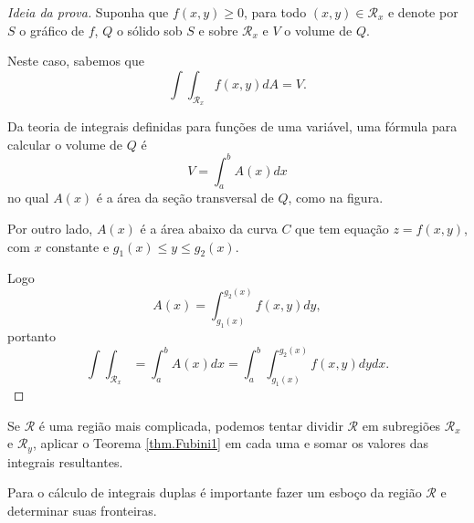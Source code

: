 \begin{proof}[Ideia da prova]
    Suponha que \(f(x,y) \geq 0\), para todo \((x,y)\in\mathcal{R}_x\) e denote por \(S\) o gráfico de \(f\), \(Q\) o sólido sob \(S\) e sobre \(\mathcal{R}_x\) e \(V\) o volume de \(Q\).

    Neste caso, sabemos que \[\int\int_{\mathcal{R}_x} f(x,y) dA = V.\]
    
    Da teoria de integrais definidas para funções de uma variável, uma fórmula para calcular o volume de \(Q\) é \[V = \int_a^b A(x) dx\] no qual \(A(x)\) é a área da seção transversal de \(Q\), como na figura.

    Por outro lado, \(A(x)\) é a área abaixo da curva \(C\) que tem equação \(z = f(x,y)\), com \(x\) constante e \(g_1(x) \leq y \leq g_2(x)\).

    Logo \[A(x) = \int_{g_1(x)}^{g_2(x)} f(x,y) dy,\] portanto \[\int\int_{\mathcal{R}_x} = \int_a^b A(x) dx = \int_a^b \int_{g_1(x)}^{g_2(x)} f(x,y) dydx.\]
\end{proof}

\begin{remark}
    Se \(\mathcal{R}\) é uma região mais complicada, podemos tentar dividir \(\mathcal{R}\) em subregiões \(\mathcal{R}_x\) e \(\mathcal{R}_y\), aplicar o Teorema \ref{thm.Fubini1} em cada uma e somar os valores das integrais resultantes.
\end{remark}

\begin{remark}
    Para o cálculo de integrais duplas é importante fazer um esboço da região \(\mathcal{R}\) e determinar suas fronteiras.
\end{remark}

